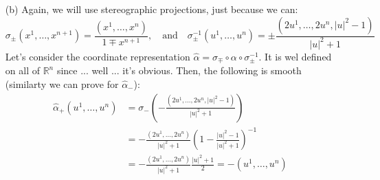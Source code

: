 \documentclass[a4paper]{article}
\begin{document}
\begin{exercise}[2-3]
\begin{enumerate}
    \item[(b)] Again, we will use stereographic projections, just because we can:
      $$
      \sigma_\pm (x^1,\dots ,x^{n+1} ) = \frac{(x^1,\dots ,x^n)}{1\mp x^{n+1} },
      \quad\text{and}\quad
      \sigma_\pm ^{-1}(u^1,\dots ,u^n) =\pm \frac{(2u^1,\dots ,2u^n,|u|^2-1)}{|u|^2+1}
      $$
      Let's consider the coordinate representation $\widehat{\alpha} = \sigma_\mp \circ \alpha \circ \sigma_\pm ^{-1}$.
      It is wel defined on all of $\mathbb{R}^n$ since ... well ... it's obvious.
      Then, the following is smooth (similarty we can prove for $\widehat{\alpha}_-$):
      \begin{align*}
        \widehat{\alpha}_+(u^1,\dots ,u^n) &= \sigma_- \left( - \frac{(2u^1,\dots ,2u^n,|u|^2-1)}{|u|^2+1}\right)
        \\&=
        -\frac{(2u^1,\dots ,2u^n)}{|u|^2+1} \left( 1 - \frac{|u|^2-1}{|u|^2+1} \right) ^{-1}
        \\&=
        -\frac{(2u^1,\dots ,2u^n)}{|u|^2+1} \frac{|u|^2+1}{2} = -(u^1,\dots ,u^n)
      \end{align*}
  \end{enumerate}
\end{exercise}
\end{document}
